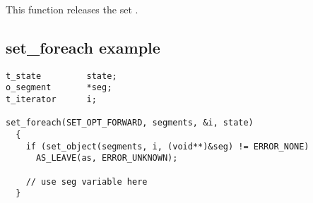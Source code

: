 	 {
	   This function releases the set .
	 }

\subsection*{set\_foreach example}

\begin{verbatim}
t_state         state;
o_segment       *seg;
t_iterator      i;

set_foreach(SET_OPT_FORWARD, segments, &i, state)
  {
    if (set_object(segments, i, (void**)&seg) != ERROR_NONE)
      AS_LEAVE(as, ERROR_UNKNOWN);

    // use seg variable here
  }
\end{verbatim}


